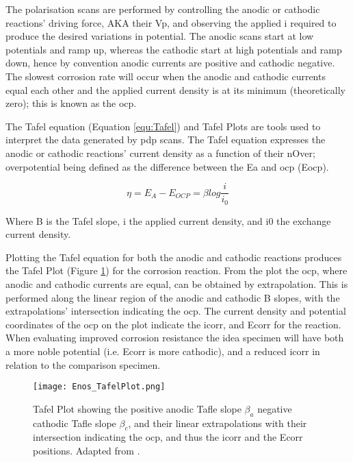 \documentclass[a4paper,12pt,oneside]{report}%
\begin{document}
The polarisation scans are performed by controlling the anodic or cathodic reactions' driving force, AKA their \gls{Vp}, and observing the applied \gls{i} required to produce the desired variations in potential. The anodic scans start at low potentials and ramp up, whereas the cathodic start at high potentials and ramp down, hence by convention anodic currents are positive and cathodic negative.  The slowest corrosion rate will occur when the anodic and cathodic currents equal each other and the applied current density is at its minimum (theoretically zero); this is known as the \gls{ocp}. 

The Tafel equation (Equation \ref{equ:Tafel}) and Tafel Plots are tools used to interpret the data generated by \gls{pdp} scans. The Tafel equation expresses the anodic or cathodic reactions' current density as a function of their \gls{nOver}; overpotential being defined as the difference between the \gls{Ea} and \gls{ocp} (\acrshort{Eocp}).

\begin{equation}
\eta = E_{A} - E_{OCP}=\beta log \frac{i}{i_{0}}
\label{equ:Tafel}
\end{equation}

Where \acrshort{B} is the Tafel slope, \acrshort{i} the applied current density, and \acrshort{i0} the exchange current density. 

Plotting the Tafel equation for both the anodic and cathodic reactions produces the Tafel Plot (Figure \ref{fig:EnosTafel}) for the corrosion reaction. From the plot the \gls{ocp}, where anodic and cathodic currents are equal, can be obtained by extrapolation. This is performed along the linear region of the anodic and cathodic \acrshort{B} slopes, with the extrapolations' intersection indicating the \gls{ocp}. The current density and potential coordinates of the \gls{ocp} on the plot indicate the \gls{icorr}, and \gls{Ecorr} for the reaction. When evaluating improved corrosion resistance the idea specimen will have both a more noble potential (i.e. \gls{Ecorr} is more cathodic),  and a reduced \gls{icorr} in relation to the comparison specimen.

\begin{figure}[htb]
	\centering
	\texttt{[image: Enos\_TafelPlot.png]}
	\caption[Tafel Plot showing the positive anodic Tafle slope $\beta_{a}$ negative cathodic Tafle slope $\beta_{c}$, and their linear extrapolations with their intersection indicating the \acrshort{ocp}, and thus the \acrshort{icorr} and the \acrshort{Ecorr} positions.]{Tafel Plot showing the positive anodic Tafle slope $\beta_{a}$ negative cathodic Tafle slope $\beta_{c}$, and their linear extrapolations with their intersection indicating the \acrshort{ocp}, and thus the \acrshort{icorr} and the \acrshort{Ecorr} positions. Adapted from \cite{Enos1997}.}
	\label{fig:EnosTafel}
\end{figure}
\end{document}

